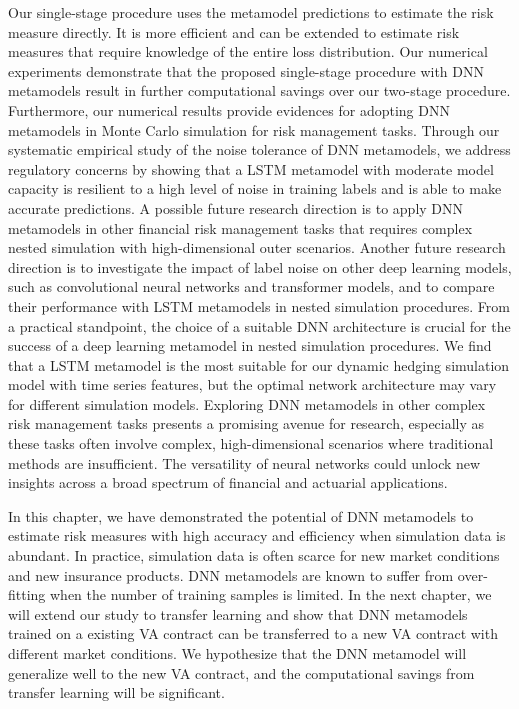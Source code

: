 Our single-stage procedure uses the metamodel predictions to estimate the risk measure directly.
It is more efficient and can be extended to estimate risk measures that require knowledge of the entire loss distribution.
Our numerical experiments demonstrate that the proposed single-stage procedure with DNN metamodels result in further computational savings over our two-stage procedure. 
Furthermore, our numerical results provide evidences for adopting DNN metamodels in Monte Carlo simulation for risk management tasks.
Through our systematic empirical study of the noise tolerance of DNN metamodels, we address regulatory concerns by showing that a LSTM metamodel with moderate model capacity is resilient to a high level of noise in training labels and is able to make accurate predictions.
A possible future research direction is to apply DNN metamodels in other financial risk management tasks that requires complex nested simulation with high-dimensional outer scenarios.
Another future research direction is to investigate the impact of label noise on other deep learning models, such as convolutional neural networks and transformer models, and to compare their performance with LSTM metamodels in nested simulation procedures. 
From a practical standpoint, the choice of a suitable DNN architecture is crucial for the success of a deep learning metamodel in nested simulation procedures.
We find that a LSTM metamodel is the most suitable for our dynamic hedging simulation model with time series features, but the optimal network architecture may vary for different simulation models.
Exploring DNN metamodels in other complex risk management tasks presents a promising avenue for research, especially as these tasks often involve complex, high-dimensional scenarios where traditional methods are insufficient. 
The versatility of neural networks could unlock new insights across a broad spectrum of financial and actuarial applications.

In this chapter, we have demonstrated the potential of DNN metamodels to estimate risk measures with high accuracy and efficiency when simulation data is abundant.
In practice, simulation data is often scarce for new market conditions and new insurance products.
DNN metamodels are known to suffer from over-fitting when the number of training samples is limited.
In the next chapter, we will extend our study to transfer learning and show that DNN metamodels trained on a existing VA contract can be transferred to a new VA contract with different market conditions.
We hypothesize that the DNN metamodel will generalize well to the new VA contract, and the computational savings from transfer learning will be significant.